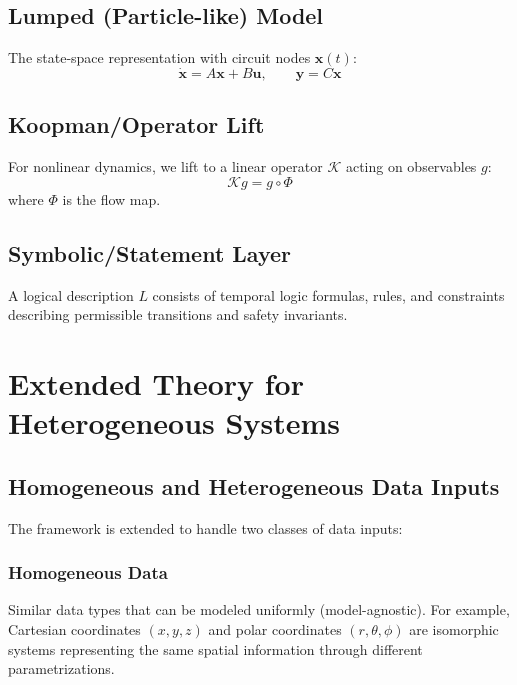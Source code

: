 \documentclass[11pt,a4paper]{article}
\begin{document}
\subsection{Lumped (Particle-like) Model}

The state-space representation with circuit nodes $\mathbf{x}(t)$:
\begin{equation}
\dot{\mathbf{x}} = A\mathbf{x} + B\mathbf{u}, \qquad \mathbf{y} = C\mathbf{x}
\end{equation}

\subsection{Koopman/Operator Lift}

For nonlinear dynamics, we lift to a linear operator $\mathcal{K}$ acting on observables $g$:
\begin{equation}
\mathcal{K} g = g \circ \Phi
\end{equation}
where $\Phi$ is the flow map.

\subsection{Symbolic/Statement Layer}

A logical description $L$ consists of temporal logic formulas, rules, and constraints describing permissible transitions and safety invariants.

\section{Extended Theory for Heterogeneous Systems}
\label{sec:heterogeneous}

\subsection{Homogeneous and Heterogeneous Data Inputs}

The framework is extended to handle two classes of data inputs:

\subsubsection{Homogeneous Data}
Similar data types that can be modeled uniformly (model-agnostic). For example, Cartesian coordinates $(x, y, z)$ and polar coordinates $(r, \theta, \phi)$ are isomorphic systems representing the same spatial information through different parametrizations.
\end{document}
